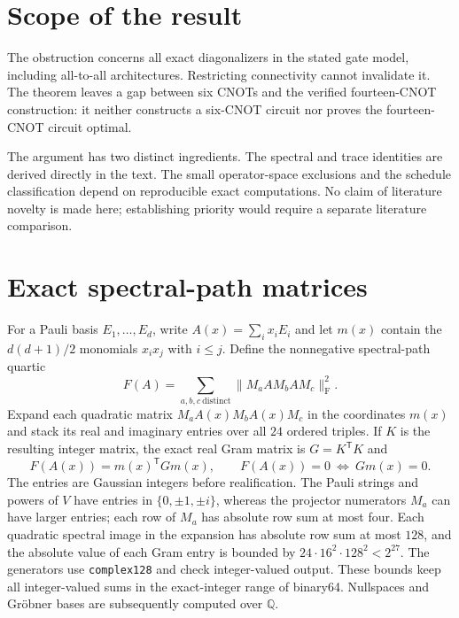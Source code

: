 \documentclass[11pt]{article}
\newcommand{\Frob}{\mathrm F}
\begin{document}
\section{Scope of the result}

The obstruction concerns all exact diagonalizers in the stated gate
model, including all-to-all architectures. Restricting connectivity
cannot invalidate it. The theorem leaves a gap between six CNOTs and
the verified fourteen-CNOT construction: it neither constructs a
six-CNOT circuit nor proves the fourteen-CNOT circuit optimal.

The argument has two distinct ingredients. The spectral and trace
identities are derived directly in the text. The small operator-space
exclusions and the schedule classification depend on reproducible exact
computations. No claim of literature novelty is made here; establishing
priority would require a separate literature comparison.

\appendix
\section{Exact spectral-path matrices}\label{app:gram}
For a Pauli basis $E_1,\ldots,E_d$, write
$A(x)=\sum_i x_iE_i$ and let $m(x)$ contain the
$d(d+1)/2$ monomials $x_ix_j$ with $i\leq j$.  Define the nonnegative
spectral-path quartic
\begin{equation}\label{eq:quartic}
F(A)=\sum_{a,b,c\ \mathrm{distinct}}
 \bigl\|M_aAM_bAM_c\bigr\|_{\Frob}^{2}.
\end{equation}
Expand each quadratic matrix $M_aA(x)M_bA(x)M_c$ in the coordinates
$m(x)$ and stack its real and imaginary entries over all $24$ ordered
triples.  If $K$ is the resulting integer matrix, the exact real Gram
matrix is $G=K^{\mathsf T}K$ and
\begin{equation}\label{eq:gram}
F(A(x))=m(x)^{\mathsf T}Gm(x),\qquad
F(A(x))=0\ \Longleftrightarrow\ Gm(x)=0.
\end{equation}
The entries are Gaussian integers before realification.  The Pauli
strings and powers of $V$ have entries in $\{0,\pm1,\pm i\}$, whereas
the projector numerators $M_a$ can have larger entries; each row of
$M_a$ has absolute row sum at most four.  Each quadratic spectral image
in the expansion has absolute row sum at most $128$, and the absolute
value of each Gram entry is bounded by
$24\cdot16^2\cdot128^2<2^{27}$.  The generators use
\texttt{complex128} and check integer-valued output.  These bounds keep
all integer-valued sums in the exact-integer range of binary64.
Nullspaces and Gr\"obner bases are subsequently computed over $\mathbb Q$.
\end{document}
